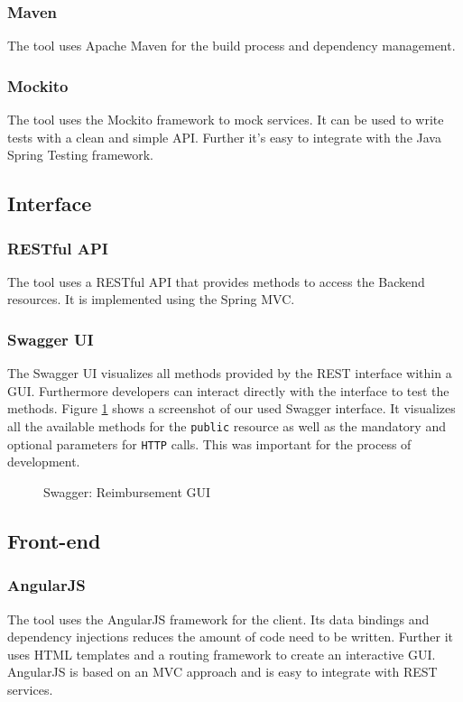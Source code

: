 \subsubsection{Maven}
The tool uses Apache Maven \cite{maven} for the build process and dependency management.  

\subsubsection{Mockito}
The tool uses the Mockito framework to mock services. It can be used to write tests with a clean and simple API. Further it's easy to integrate with the Java Spring Testing framework. \cite{mockito}

\subsection{Interface}

\subsubsection{RESTful API}
\label{sec:restfulapi}
The tool uses a RESTful API that provides methods to access the Backend resources. It is implemented using the Spring MVC. 

\subsubsection{Swagger UI}
The Swagger UI visualizes all methods provided by the REST interface within a GUI. Furthermore developers can interact directly with the interface to test the methods. Figure \ref{fig:swagger01} shows a screenshot of our used Swagger interface. It visualizes all the available methods for the \texttt{public} resource as well as the mandatory and optional parameters for \texttt{HTTP} calls. This was important for the process of development. \cite{swagger}

\begin{figure}[H]
    \centering
    \caption{Swagger: Reimbursement GUI}
    \label{fig:swagger01}
\end{figure}

\subsection{Front-end}

\subsubsection{AngularJS}
The tool uses the AngularJS framework for the client. Its data bindings and dependency injections reduces the amount of code need to be written. Further it uses HTML templates and a routing framework to create an interactive GUI. AngularJS is based on an MVC approach and is easy to integrate with REST services. \cite{angular}   


